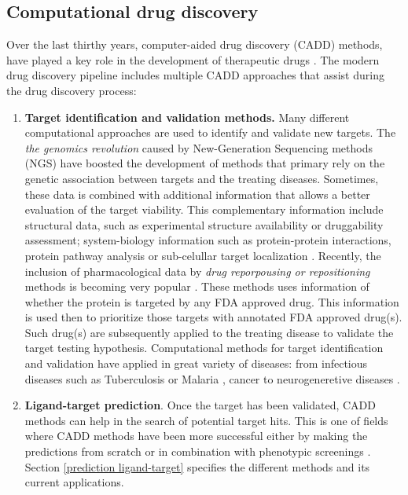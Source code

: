 \documentclass[12pt, a4paper,twoside]{tesi_upf}
\begin{document}
{\begin{figure}[!tbp]
	\vspace*{4mm}
\end{figure}
  

\subsection{Computational drug discovery}\label{computational drug discovery}

\par Over the last thirthy years, computer-aided drug discovery (CADD) methods, have played a key role in the development of therapeutic drugs \cite{Sliwoski2014}. The modern drug discovery pipeline includes multiple CADD approaches that assist during the drug discovery process:

\begin{enumerate}

\item \textbf{Target identification and validation methods.} Many different computational approaches are used to identify and validate new targets. The \textit{the genomics revolution} caused by New-Generation Sequencing methods (NGS) have boosted the development of methods that primary rely on the genetic association between targets and the treating diseases. Sometimes, these data is combined with additional information that allows a better evaluation of the target viability. This complementary information include structural data,  such as experimental structure availability or druggability assessment; system-biology information such as protein-protein interactions, protein pathway analysis or sub-celullar target localization \cite{Yang2009}. Recently, the inclusion of pharmacological data by \textit{drug reporpousing or repositioning} methods is becoming very popular \cite{predict, Zhang2011, YutakaFukuoka2013}. These methods uses information of whether the protein is targeted by any FDA approved drug. This information is used then to prioritize those targets with annotated FDA approved drug(s). Such drug(s) are subsequently applied to the treating disease to validate the target testing hypothesis. Computational methods for target identification and validation have applied in great variety of diseases: from infectious diseases such as Tuberculosis \cite{Raman2008} or Malaria \cite{Phaiphinit2016}, cancer \cite{Jeon2014} to neurogeneretive diseases \cite{Augustin2012}. 

\item \textbf{Ligand-target prediction}. Once the target has been validated, CADD methods can help in the search of potential target hits. This is one of fields where CADD methods have been more successful either by making the predictions from scratch or in combination with phenotypic screenings \cite{Martinez-Jimenez2013}. Section \ref{prediction ligand-target} specifies the different methods and its current applications.   


\end{enumerate}}
\end{document}
